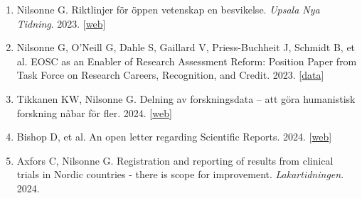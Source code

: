 \documentclass[10pt,a4paper,twocolumn]{article}
\begin{document}
\begin{enumerate}
    \item Nilsonne G. Riktlinjer för öppen vetenskap en besvikelse. \textit{Upsala Nya Tidning}. 2023. [\href{https://unt.se/debatt/artikel/kungliga-biblioteket-missar-malet-universiteten-blir-forlorare/lw778xwr}{web}]

    \item Nilsonne G, O'Neill G, Dahle S, Gaillard V, Priess-Buchheit J, Schmidt B, et al. EOSC as an Enabler of Research Assessment Reform: Position Paper from Task Force on Research Careers, Recognition, and Credit. 2023. [\href{https://doi.org/10.5281/zenodo.10417069}{data}]

    \item Tikkanen KW, Nilsonne G. Delning av forskningsdata – att göra humanistisk forskning nåbar för fler. 2024. [\href{https://humtank.se/svensk-nationell-datatjanst-delning-av-forskningsdata-att-gora-humanistisk-forskning-nabar-for-fler/}{web}]

    \item Bishop D, et al. An open letter regarding Scientific Reports. 2024. [\href{https://deevybee.blogspot.com/2024/10/an-open-letter-regarding-scientific.html}{web}]

    \item Axfors C, Nilsonne G. Registration and reporting of results from clinical trials in Nordic countries - there is scope for improvement. \textit{Lakartidningen}. 2024.

\end{enumerate}


\end{document}
